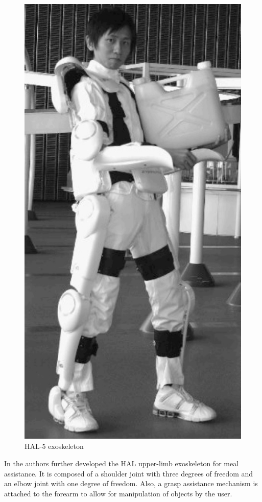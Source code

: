    \begin{figure}[thpb]
      \centering
      \includegraphics[scale=0.4]{Images/HAL5.jpg}
      \caption{HAL-5 exoskeleton \cite{Sankai2011}}
      \label{HAL5}
   \end{figure}
   
   In \cite{Otsuka6181399} the authors further developed the HAL upper-limb exoskeleton for meal assistance. It is composed of a shoulder joint with three degrees of freedom and an elbow joint with one degree of freedom. Also, a grasp assistance mechanism is attached to the forearm to allow for manipulation of objects by the user.
   
